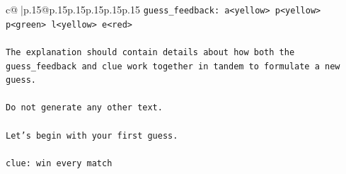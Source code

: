 \documentclass{article}
\begin{document}
{\begin{supertabular}{c@{$\;$}|p{.15\linewidth}@{}p{.15\linewidth}p{.15\linewidth}p{.15\linewidth}p{.15\linewidth}p{.15\linewidth}}
{{{\texttt{guess\_feedback: a<yellow> p<yellow> p<green> l<yellow> e<red>} \\
\\ 
\texttt{The explanation should contain details about how both the guess\_feedback and clue work together in tandem to formulate a new guess.} \\
\\ 
\texttt{Do not generate any other text.} \\
\\ 
\texttt{Let's begin with your first guess.} \\
\\ 
\texttt{clue: win every match} \\
            }
        }
    }
     \\ \\


\end{supertabular}}
\end{document}

